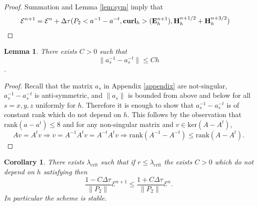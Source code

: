 \documentclass[12pt,reqno]{amsart}
\newcommand{\curl}{{\bf curl}}
\newcommand{\e}{{\bf E}}
\newcommand{\h}{{\bf H}}
\newtheorem{cor}[theorem]{Corollary}
\newtheorem{lem}[theorem]{Lemma}
\newtheorem{rem}[theorem]{Remark}
\theoremstyle{definition}
\numberwithin{equation}{section}
\begin{document}
\begin{proof}
Summation and Lemma \ref{lem:sym} imply that 
\begin{align*}
	&
	{\mathcal E}^{n+1}=	{\mathcal E}^{n}+
	\Delta \tau(P_2<a^{-1}-a^{-t},\curl_h>(\e_h^{n+1}),\h_h^{n+1/2}+\h_h^{n+3/2})
\end{align*}
\end{proof}
\begin{lem}
There exists $C>0$ such that $$\|a_s^{-1}-a_s^{-t}\|\leq Ch$$.
\end{lem}
\begin{proof}
	Recall that the matrix  $a_s $ in Appendix \ref{appendix} are not-singular,  $a_s^{-1}-a_s^{-t}$ is anti-symmetric, and $\|a_s\|$ is bounded from above and below for all $s=x,y,z$ uniformly for $h$. Therefore it is enough to show that $a_s^{-1}-a_s^{-t}$ is of constant rank which do not depend on $h$. This follows  by the observation that 
	$\mathrm{rank}(a-a^t)\leq 8$ and for any non-singular matrix and $v\in \mathrm{ker}(A-A^t)$,
	$$
	Av=A^tv \Rightarrow v=A^{-1}A^{t}v=A^{-t}A^{t}v\Rightarrow
	\mathrm{rank}(A^{-1}-A^{-t})\leq 	\mathrm{rank}(A-A^t).
	$$
\end{proof}

\begin{cor}
	There exists 
	$\lambda_{\mathrm{crit}}$ such that if $r\leq \lambda_{\mathrm{crit}}$
	the exists $C>0$ which do not depend on $h$ satisfying
	then 
	$$
	\frac{1-C\Delta \tau}{\|P_2\|} \mathcal{E}^{n+1} \leq \frac{1+C\Delta \tau}{\|P_2\|}\mathcal{E}^n.
	$$
 In particular the scheme is stable.
\end{cor}

\end{document}
